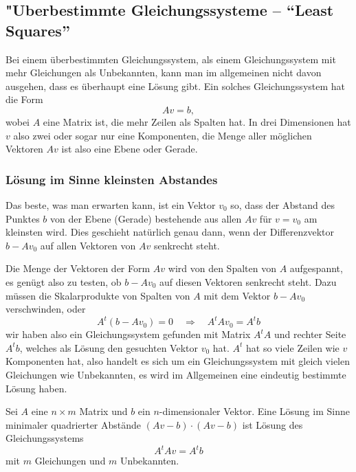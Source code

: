 \subsection{"Uberbestimmte Gleichungssysteme -- ``Least Squares''\label{section-least-squares}}
Bei einem überbestimmten Gleichungssystem, als einem Gleichungssystem
mit mehr Gleichungen als Unbekannten, kann man im allgemeinen nicht davon
ausgehen, dass es überhaupt eine Lösung gibt.
Ein solches Gleichungssystem hat die Form
\[
A v= b,
\]
wobei $A$ eine Matrix ist, die mehr Zeilen als Spalten hat.
In drei Dimensionen hat $v$ also zwei oder sogar nur eine Komponenten,
die Menge aller möglichen Vektoren $Av$ ist also eine Ebene oder
Gerade.

\subsubsection{Lösung im Sinne kleinsten Abstandes}
Das beste, was man erwarten kann, ist ein Vektor $v_0$ so, dass
der Abstand des Punktes $ b$ von der Ebene (Gerade) bestehende
aus allen $Av$ für $v=v_0$ am kleinsten wird.
Dies geschieht
natürlich genau dann, wenn der Differenzvektor $b-Av_0$ auf
allen Vektoren von $Av$ senkrecht steht.

Die Menge der Vektoren der Form $Av$ wird von den Spalten von $A$
aufgespannt, es genügt also zu testen, ob $b-Av_0$ auf diesen
Vektoren senkrecht steht.
Dazu müssen die Skalarprodukte von
Spalten von $A$ mit dem Vektor $b-Av_0$ verschwinden, oder
\[
A^t(b-Av_0)=0
\quad
\Rightarrow
\quad
A^tAv_0=A^tb
\]
wir haben also ein Gleichungssystem gefunden mit Matrix $A^tA$ und
rechter Seite $A^tb$, welches als Lösung den gesuchten Vektor
$v_0$ hat.
$A^t$ hat so viele Zeilen wie $v$ Komponenten hat, also
handelt es sich um ein Gleichungssystem mit gleich vielen Gleichungen
wie Unbekannten, es wird im Allgemeinen eine eindeutig bestimmte
Lösung haben.

\begin{satz} Sei $A$ eine $n\times m$ Matrix und $b$ ein $n$-dimensionaler
Vektor.
Eine Lösung im Sinne minimaler quadrierter Abstände
$
(Av-b)\cdot(Av-b)
$
ist Lösung des Gleichungssystems
\[
A^tAv=A^tb
\]
mit $m$ Gleichungen und $m$ Unbekannten.
\end{satz}

